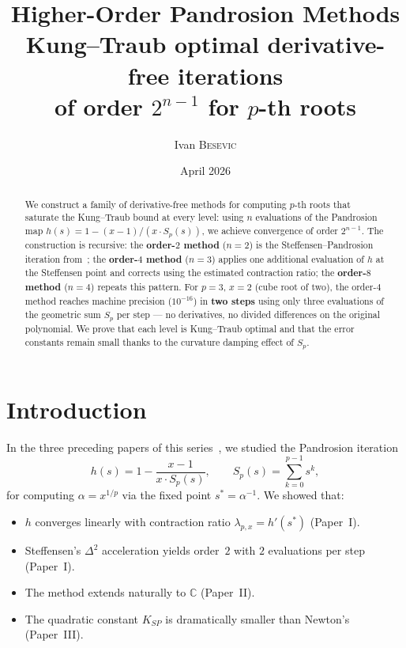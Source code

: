 \documentclass[11pt,a4paper]{article}
\title{\textbf{Higher-Order Pandrosion Methods}\\[0.3em]
  \large Kung--Traub optimal derivative-free iterations\\
  of order $2^{n-1}$ for $p$-th roots}
\author{Ivan \textsc{Besevic}}
\date{April 2026}
\theoremstyle{definition}
\newcommand{\CC}{\mathbb{C}}
\begin{document}
\maketitle

\begin{abstract}
We construct a family of derivative-free methods for computing $p$-th roots that saturate the Kung--Traub bound at every level: using $n$ evaluations of the Pandrosion map $h(s) = 1 - (x-1)/(x\cdot S_p(s))$, we achieve convergence of order $2^{n-1}$.  The construction is recursive: the \textbf{order-$2$ method} ($n=2$) is the Steffensen--Pandrosion iteration from~\cite{besevic2026}; the \textbf{order-$4$ method} ($n=3$) applies one additional evaluation of $h$ at the Steffensen point and corrects using the estimated contraction ratio; the \textbf{order-$8$ method} ($n=4$) repeats this pattern.  For $p=3$, $x=2$ (cube root of two), the order-$4$ method reaches machine precision ($10^{-16}$) in \textbf{two steps} using only three evaluations of the geometric sum $S_p$ per step --- no derivatives, no divided differences on the original polynomial.  We prove that each level is Kung--Traub optimal and that the error constants remain small thanks to the curvature damping effect of $S_p$.
\end{abstract}

\tableofcontents
\bigskip

\section{Introduction}

In the three preceding papers of this series~\cite{besevic2026,besevic2026b,besevic2026c}, we studied the Pandrosion iteration
\begin{equation}
  \label{eq:pandrosion}
  h(s) = 1 - \frac{x-1}{x \cdot S_p(s)},
  \qquad S_p(s) = \sum_{k=0}^{p-1} s^k,
\end{equation}
for computing $\alpha = x^{1/p}$ via the fixed point $s^* = \alpha^{-1}$.  We showed that:
\begin{itemize}
  \item $h$ converges linearly with contraction ratio $\lambda_{p,x} = h'(s^*)$ (Paper~I).
  \item Steffensen's $\Delta^2$ acceleration yields order~$2$ with $2$ evaluations per step (Paper~I).
  \item The method extends naturally to $\CC$ (Paper~II).
  \item The quadratic constant $K_{SP}$ is dramatically smaller than Newton's (Paper~III).
\end{itemize}
\end{document}

